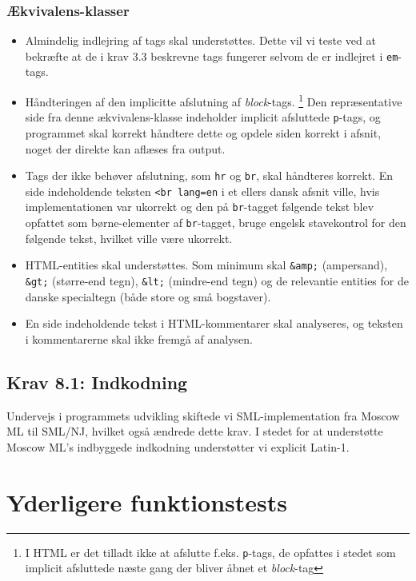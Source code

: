 \documentclass[a4paper,oneside,article]{memoir}
\begin{document}
\subsection{Ækvivalens-klasser}
\begin{itemize}
\item Almindelig indlejring af tags skal understøttes. Dette vil vi
  teste ved at bekræfte at de i krav 3.3 beskrevne tags fungerer
  selvom de er indlejret i \texttt{em}-tags.
\item Håndteringen af den implicitte afslutning af
  \textit{block}-tags. \footnote{I HTML er det tilladt ikke at
    afslutte f.eks. \texttt{p}-tags, de opfattes i stedet som implicit
    afsluttede næste gang der bliver åbnet et \textit{block}-tag} Den
  repræsentative side fra denne ækvivalens-klasse indeholder implicit
  afsluttede \texttt{p}-tags, og programmet skal korrekt håndtere
  dette og opdele siden korrekt i afsnit, noget der direkte kan
  aflæses fra output.
\item Tags der ikke behøver afslutning, som \texttt{hr} og
  \texttt{br}, skal håndteres korrekt. En side indeholdende teksten
  \texttt{<br lang=en} i et ellers dansk afsnit ville, hvis
  implementationen var ukorrekt og den på \texttt{br}-tagget følgende
  tekst blev opfattet som børne-elementer af \texttt{br}-tagget, bruge
  engelsk stavekontrol for den følgende tekst, hvilket ville være
  ukorrekt.
\item HTML-entities skal understøttes. Som minimum skal \texttt{\&amp;}
  (ampersand), \texttt{\&gt;} (større-end tegn), \texttt{\&lt;}
  (mindre-end tegn) og de relevantie entities for de danske
  specialtegn (både store og små bogstaver).
\item En side indeholdende tekst i HTML-kommentarer skal analyseres,
  og teksten i kommentarerne skal ikke fremgå af analysen.
\end{itemize}

\section{Krav 8.1: Indkodning}

Undervejs i programmets udvikling skiftede vi SML-implementation fra
Moscow ML til SML/NJ, hvilket også ændrede dette krav. I stedet for at
understøtte Moscow ML's indbyggede indkodning understøtter vi explicit
Latin-1.

\chapter{Yderligere funktionstests}
\end{document}
